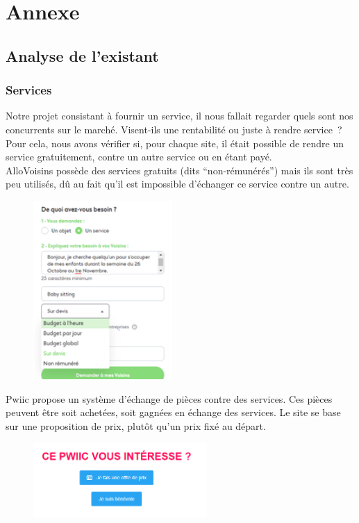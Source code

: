 \documentclass[a4paper,11pt]{article}
\begin{document}
\section{Annexe}

\subsection{Analyse de l'existant}

\subsubsection{Services}

Notre projet consistant à fournir un service, il nous fallait regarder quels sont nos concurrents sur le marché.
Visent-ils une rentabilité ou juste à rendre service ? Pour cela, nous avons vérifier si, pour chaque site,
il était possible de rendre un service gratuitement, contre un autre service ou en étant payé.\\

AlloVoisins possède des services gratuits (dits “non-rémunérés”) mais ils sont très peu utilisés,
dû au fait qu’il est impossible d’échanger ce service contre un autre.\\
 
\begin{figure}[H]
  \includegraphics[width=200px]{images/services-allovoisins.png}
  \label{fig:services-allovoisins}
\end{figure}

Pwiic propose un système d’échange de pièces contre des services. Ces pièces peuvent être soit achetées,
soit gagnées en échange des services. Le site se base sur une proposition de prix, plutôt qu’un prix fixé au départ.\\

\begin{figure}[H]
  \includegraphics[width=250px]{images/pieces-pwiic.png}
  \label{fig:pieces-pwiic}
\end{figure}
\end{document}
